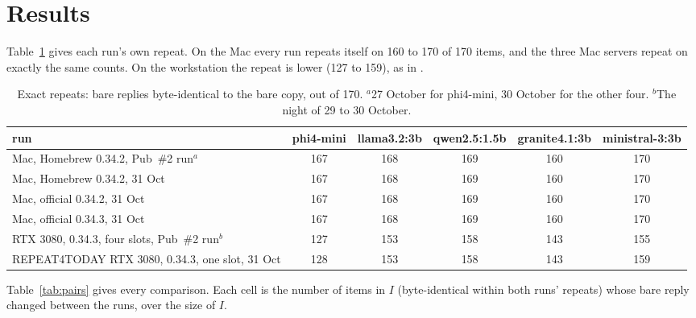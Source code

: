 \documentclass[11pt]{article}
\begin{document}
\section{Results}
Table~\ref{tab:repeats} gives each run's own repeat. On the Mac every run repeats itself on 160 to 170 of 170 items, and the three Mac
servers repeat on exactly the same counts. On the workstation the repeat is lower (127 to 159), as in \citep{pub2}.

\begin{table}[h]\centering\small
\begin{tabular}{lccccc}\toprule
run & phi4-mini & llama3.2:3b & qwen2.5:1.5b & granite4.1:3b & ministral-3:3b \\\midrule
Mac, Homebrew 0.34.2, Pub~\#2 run$^{a}$ & 167 & 168 & 169 & 160 & 170 \\
Mac, Homebrew 0.34.2, 31 Oct & 167 & 168 & 169 & 160 & 170 \\
Mac, official 0.34.2, 31 Oct & 167 & 168 & 169 & 160 & 170 \\
Mac, official 0.34.3, 31 Oct & 167 & 168 & 169 & 160 & 170 \\
RTX 3080, 0.34.3, four slots, Pub~\#2 run$^{b}$ & 127 & 153 & 158 & 143 & 155 \\
REPEAT4TODAY
RTX 3080, 0.34.3, one slot, 31 Oct & 128 & 153 & 158 & 143 & 159 \\\bottomrule
\end{tabular}
\caption{Exact repeats: bare replies byte-identical to the bare copy, out of 170. $^{a}$27 October for phi4-mini, 30 October for the other four. $^{b}$The night of 29 to 30 October.}\label{tab:repeats}
\end{table}

Table~\ref{tab:pairs} gives every comparison. Each cell is the number of items in $I$ (byte-identical within both runs' repeats) whose bare
reply changed between the runs, over the size of $I$.
\end{document}
